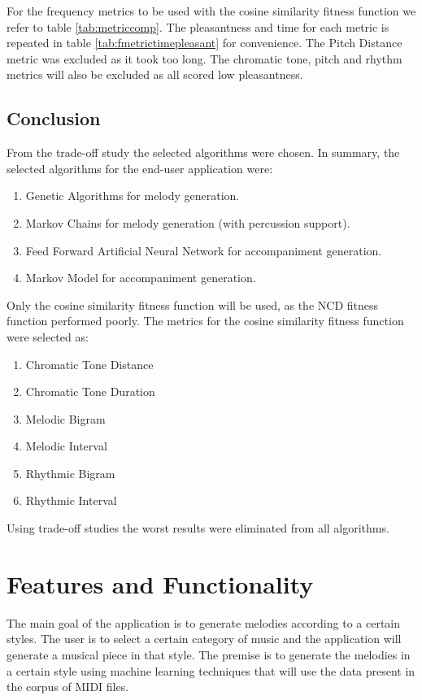 For the frequency metrics to be used with the cosine similarity fitness function we refer to table \ref{tab:metriccomp}. The pleasantness and time for each metric is repeated in table \ref{tab:fmetrictimepleasant} for convenience. The Pitch Distance metric was excluded as it took too long. The chromatic tone, pitch and rhythm metrics will also be excluded as all scored low pleasantness. 


\section{Conclusion}
From the trade-off study the selected algorithms were chosen.
In summary, the selected algorithms for the end-user application were:
\begin{enumerate}
\item Genetic Algorithms for melody generation.
\item Markov Chains for melody generation (with percussion support).
\item Feed Forward Artificial Neural Network for accompaniment generation.
\item Markov Model for accompaniment generation.
\end{enumerate}

Only the cosine similarity fitness function will be used, as the \ac{NCD} fitness function performed poorly. The metrics for the cosine similarity fitness function were selected as:
\begin{enumerate}
\item Chromatic Tone Distance
\item Chromatic Tone Duration
\item Melodic Bigram
\item Melodic Interval
\item Rhythmic Bigram
\item Rhythmic Interval
\end{enumerate}

Using trade-off studies the worst results were eliminated from all algorithms.

\chapter{Features and Functionality}
The main goal of the application is to generate melodies according to a certain styles. The user is to select a certain category of music and the application will generate a musical piece in that style. The premise is to generate the melodies in a certain style using machine learning techniques that will use the data present in the corpus of MIDI files. 

